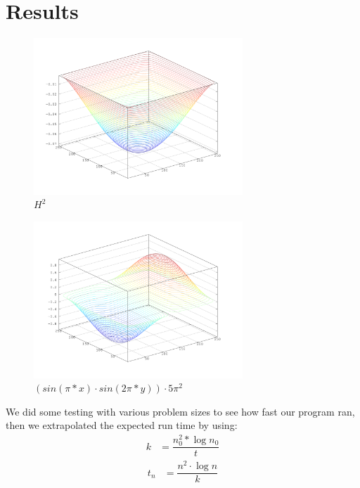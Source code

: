 \section{Results}

\FloatBarrier
\begin{figure}[t]
  \centering
    \includegraphics[width=0.7\textwidth]{datashit512flat_v2.png}
    \caption{$H^2$}
\end{figure}

\begin{figure}[t]
  \centering
    \includegraphics[width=0.7\textwidth]{datashit512sinpixsin2pix_v2.png}
    \caption{$(sin(\pi*x)\cdot sin(2\pi*y))\cdot 5\pi^2$}
\end{figure}
\FloatBarrier
We did some testing with various problem sizes to see how fast our program ran, then we
extrapolated the expected run time by using:
\begin{align}
k &= 
    \dfrac{n_{0}^2*\log{n_{0}}}{t}
\end{align}
\begin{align}    
t_{n} &= \dfrac
        {n^2\cdot\log{n}}
        {k} 
\end{align}

